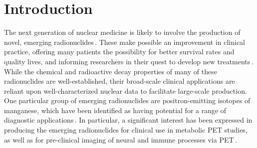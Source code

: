
\section{\label{sec:intro_fe}Introduction}



The next generation of nuclear medicine 
is likely to involve the production of novel, emerging radionuclides\,\cite{Qaim201731}. 
These make possible an improvement in clinical practice, offering many patients the possibility for better survival rates and quality lives, and informing researchers in their quest to develop new treatments\,\cite{Mulford2005,Muller2014}.
While the chemical and radioactive decay properties of many of these radionuclides are well-established, their broad-scale  clinical applications are reliant upon well-characterized nuclear data to facilitate large-scale   production. 
% 
% 
% 
One particular group of  emerging radionuclides are 
positron-emitting isotopes of manganese, which have been identified as having potential for a range of diagnostic applications\,\cite{J.2013,Graves2015,Lewis2015,PhysRevC.96.014613,Wooten2017,Hernandez2017}.
In particular, a significant interest has been expressed in producing the emerging radionuclides  for clinical use in metabolic PET studies, as well as   for pre-clinical imaging of neural and immune processes via PET\,\cite{Graves2016}. 

